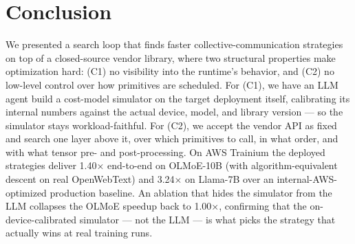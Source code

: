 \section{Conclusion}
\label{sec:conclusion}

We presented a search loop that finds faster collective-communication strategies on top of a closed-source vendor library, where two structural properties make optimization hard: (C1) no visibility 
into the runtime's behavior, and (C2) no low-level control over how primitives are scheduled. For (C1), we have an LLM agent build a cost-model simulator on the target deployment itself, calibrating its internal numbers against the actual device, model, and library version — so the simulator stays workload-faithful. For (C2), we accept the vendor API as fixed and search one layer above it, over which primitives to call, in what order, and with what tensor pre- and post-processing. On AWS Trainium the deployed strategies deliver 1.40× end-to-end on OLMoE-10B (with algorithm-equivalent descent on real OpenWebText) and 3.24× on Llama-7B over an internal-AWS-optimized production baseline. An ablation that hides the simulator from the LLM collapses the OLMoE speedup back to 1.00×, confirming that the on-device-calibrated simulator — not the LLM — is what picks the strategy that actually wins at real training runs.

\newpage

